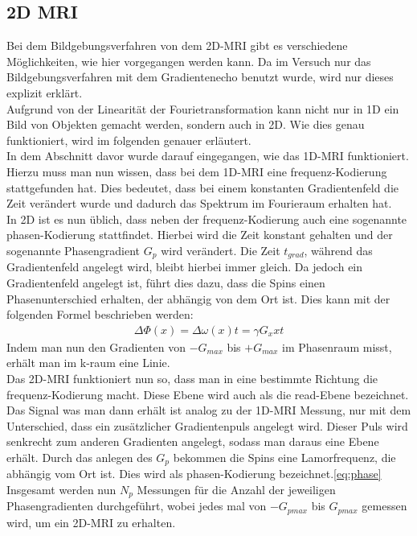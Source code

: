 \subsection{2D MRI}
Bei dem Bildgebungsverfahren von dem 2D-MRI gibt es verschiedene Möglichkeiten, wie hier vorgegangen werden kann. Da im Versuch nur das Bildgebungsverfahren mit dem Gradientenecho benutzt wurde, wird nur dieses explizit erklärt.\\
Aufgrund von der Linearität der Fourietransformation kann nicht nur in 1D ein Bild von Objekten gemacht werden, sondern auch in 2D. Wie dies genau funktioniert, wird im folgenden genauer erläutert.\\
In dem Abschnitt davor wurde darauf eingegangen, wie das 1D-MRI funktioniert. Hierzu muss man nun wissen, dass bei dem 1D-MRI eine frequenz-Kodierung stattgefunden hat. Dies bedeutet, dass bei einem konstanten Gradientenfeld die Zeit verändert wurde und dadurch das Spektrum im Fourieraum erhalten hat. \\
In 2D ist es nun üblich, dass neben der frequenz-Kodierung auch eine sogenannte phasen-Kodierung stattfindet. Hierbei wird die Zeit konstant gehalten und der sogenannte Phasengradient $G_p$ wird verändert. Die Zeit $t_{grad}$, während das Gradientenfeld angelegt wird, bleibt hierbei immer gleich. Da jedoch ein Gradientenfeld angelegt ist, führt dies dazu, dass die Spins einen Phasenunterschied erhalten, der abhängig von dem Ort ist. Dies kann mit der folgenden Formel beschrieben werden:
\begin{align}
    \Delta\Phi(x)= \Delta\omega(x)t=\gamma G_xxt
\end{align}\label{eq:phase}
Indem man nun den Gradienten von $-G_{max}$ bis $+G_{max}$ im Phasenraum misst, erhält man im k-raum eine Linie.\\
Das 2D-MRI funktioniert nun so, dass man in eine bestimmte Richtung die frequenz-Kodierung macht. Diese Ebene wird auch als die read-Ebene bezeichnet. Das Signal was man dann erhält ist analog zu der 1D-MRI Messung, nur mit dem Unterschied, dass ein zusätzlicher Gradientenpuls angelegt wird. Dieser Puls wird senkrecht zum anderen Gradienten angelegt, sodass man daraus eine Ebene erhält. Durch das anlegen des $G_p$ bekommen die Spins eine Lamorfrequenz, die abhängig vom Ort ist. Dies wird als phasen-Kodierung bezeichnet.\ref{eq:phase}
Insgesamt werden nun $N_p$ Messungen für die Anzahl der jeweiligen Phasengradienten durchgeführt, wobei jedes mal von $-G_{pmax}$ bis $G_{pmax}$ gemessen wird, um ein 2D-MRI zu erhalten.
